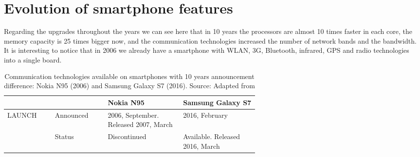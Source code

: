 

\chapter{Evolution of smartphone features}
\label{ape:gsmarena-n95-s7}

Regarding the upgrades throughout the years we can see here that in 10 years the processors are almost 10 times faster in each core, the memory capacity is 25 times bigger now, and  the communication technologies increased the number of network bands and the bandwidth.
It is interesting to notice that in 2006 we already have a smartphone with WLAN, 3G, Bluetooth, infrared, GPS and radio technologies into a single board.

\begin{longtable}{llp{0.3\linewidth}p{0.3\linewidth}}
\caption{Communication technologies available on smartphones with 10 years announcement difference: Nokia N95 (2006) and Samsung Galaxy S7 (2016). Source: Adapted from \cite{GSMARENA2016-n95-s7}} \\ \hline
         &               & Nokia N95                                                   & Samsung Galaxy S7                                                                                                                                                                                                  \\ \hline \endhead
         
LAUNCH   & Announced     & 2006, September. Released 2007, March                        & 2016, February                                                                                                                                                                                              \\
         & Status        & Discontinued                                                 & Available. Released 2016, March                                                                                                                                                                             \\ \hline
         

\end{longtable}
